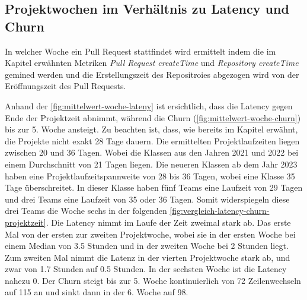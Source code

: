 \subsection{Projektwochen im Verhältnis zu Latency und Churn}
\label{sec:ProjektwochenLatencyChurn}
In welcher Woche ein Pull Request stattfindet wird ermittelt indem die im Kapitel  erwähnten Metriken \textit{Pull Request createTime} und \textit{Repository createTime} gemined werden und die Erstellungszeit des Repositroies abgezogen wird von der Eröffnungszeit des Pull Requests. 


Anhand der \autoref{fig:mittelwert-woche-lateny} ist ersichtlich, dass die Latency gegen Ende der Projektzeit abnimmt, während die Churn (\autoref{fig:mittelwert-woche-churn}) bis zur 5. Woche ansteigt. 
Zu beachten ist, dass, wie bereits im Kapitel  erwähnt, die Projekte nicht exakt 28 Tage dauern. Die ermittelten Projektlaufzeiten liegen zwischen 20 und 36 Tagen.
Wobei die Klassen aus den Jahren 2021 und 2022 bei einem Durchschnitt von 21 Tagen liegen. Die neueren Klassen ab dem Jahr 2023 haben eine Projektlaufzeitspannweite von 28 bis 36 Tagen, wobei eine Klasse 35 Tage überschreitet. In dieser Klasse haben fünf Teams eine Laufzeit von 29 Tagen und drei Teams eine Laufzeit von 35 oder 36 Tagen. Somit widerspiegeln diese drei Teams die Woche sechs in der folgenden \autoref{fig:vergleich-latency-churn-projektzeit}. Die Latency nimmt im Laufe der Zeit zweimal stark ab. Das erste Mal von der ersten zur zweiten Projektwoche, wobei sie in der ersten Woche bei einem Median von 3.5 Stunden und in der zweiten Woche bei 2 Stunden liegt. Zum zweiten Mal nimmt die Latenz in der vierten Projektwoche stark ab, und zwar von 1.7 Stunden auf 0.5 Stunden. In der sechsten Woche ist die Latency nahezu 0. Der Churn steigt bis zur 5. Woche kontinuierlich von 72 Zeilenwechseln auf 115 an und sinkt dann in der 6. Woche auf 98.
